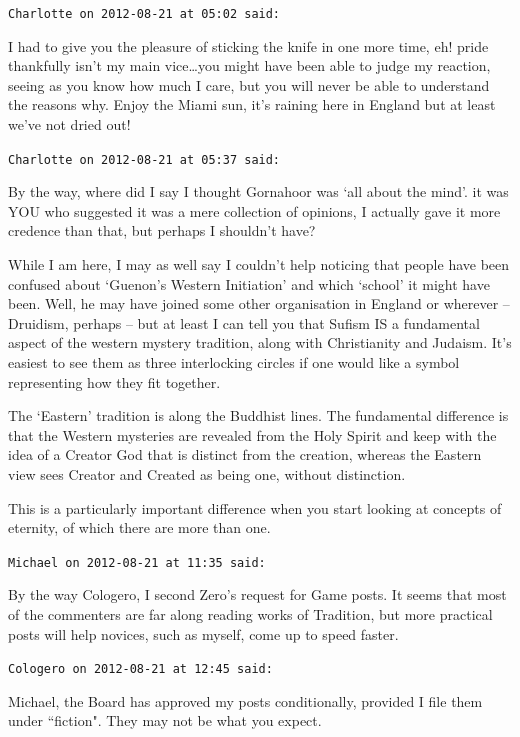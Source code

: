\begin{footnotesize}
\begin{sffamily}
\hfill

\texttt{Charlotte on 2012-08-21 at 05:02 said: }

I had to give you the pleasure of sticking the knife in one more time, eh! pride thankfully isn't my main vice…you might have been able to judge my reaction, seeing as you know how much I care, but you will never be able to understand the reasons why. Enjoy the Miami sun, it's raining here in England but at least we've not dried out!


\hfill

\texttt{Charlotte on 2012-08-21 at 05:37 said: }

By the way, where did I say I thought Gornahoor was `all about the mind'. it was YOU who suggested it was a mere collection of opinions, I actually gave it more credence than that, but perhaps I shouldn't have? 

While I am here, I may as well say I couldn't help noticing that people have been confused about `Guenon's Western Initiation' and which `school' it might have been. Well, he may have joined some other organisation in England or wherever – Druidism, perhaps – but at least I can tell you that Sufism IS a fundamental aspect of the western mystery tradition, along with Christianity and Judaism. It's easiest to see them as three interlocking circles if one would like a symbol representing how they fit together. 

The `Eastern' tradition is along the Buddhist lines. The fundamental difference is that the Western mysteries are revealed from the Holy Spirit and keep with the idea of a Creator God that is distinct from the creation, whereas the Eastern view sees Creator and Created as being one, without distinction. 

This is a particularly important difference when you start looking at concepts of eternity, of which there are more than one.


\hfill

\texttt{Michael on 2012-08-21 at 11:35 said: }

By the way Cologero, I second Zero's request for Game posts. It seems that most of the commenters are far along reading works of Tradition, but more practical posts will help novices, such as myself, come up to speed faster.


\hfill

\texttt{Cologero on 2012-08-21 at 12:45 said: }

Michael, the Board has approved my posts conditionally, provided I file them under ``fiction". They may not be what you expect.


\end{sffamily}
\end{footnotesize}
